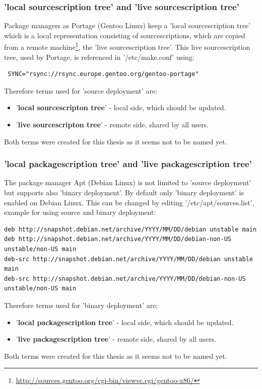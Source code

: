 \documentclass[a4paper,10pt]{article}
\begin{document}
\subsubsection*{'local sourcescription tree' and 'live sourcescription tree'}
Package managers as Portage (Gentoo Linux) keep a 'local sourcescription tree' which is a local representation consisting of sourcescriptions, which are copied from a remote machine\footnote{\url{http://sources.gentoo.org/cgi-bin/viewvc.cgi/gentoo-x86/}}, the 'live sourcescription tree'. This live sourcescription tree, used by Portage, is referenced in '/etc/make.conf' using:
\begin{verbatim} SYNC="rsync://rsync.europe.gentoo.org/gentoo-portage" \end{verbatim}
Therefore terms used for 'source deployment' are:
\begin{itemize}
 \item '\textbf{local sourcescripton tree}' - local side, which should be updated.
 \item '\textbf{live sourcescripton tree}' - remote side, shared by all users.
\end{itemize}
Both terms were created for this thesis as it seems not to be named yet.
  

\subsubsection*{'local packagescription tree' and 'live packagescription tree'}
The package manager Apt (Debian Linux) is not limited to 'source deployment' but supports also 'binary deployment'. By default only 'binary deployment' is enabled on Debian Linux. This can be changed by editing '/etc/apt/sources.list', example for using source and binary deployment:
\begin{verbatim}
deb http://snapshot.debian.net/archive/YYYY/MM/DD/debian unstable main 
deb http://snapshot.debian.net/archive/YYYY/MM/DD/debian-non-US unstable/non-US main 
deb-src http://snapshot.debian.net/archive/YYYY/MM/DD/debian unstable main 
deb-src http://snapshot.debian.net/archive/YYYY/MM/DD/debian-non-US unstable/non-US main 
\end{verbatim}

Therefore terms used for 'binary deployment' are:
\begin{itemize}
 \item '\textbf{local packagescription tree}' - local side, which should be updated.
 \item '\textbf{live packagescription tree}' - remote side, shared by all users.
\end{itemize}
Both terms were created for this thesis as it seems not to be named yet.
\end{document}
